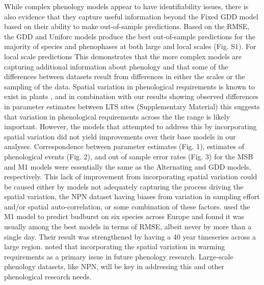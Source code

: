 \documentclass[fleqn,10pt,lineno]{wlpeerj} %
\begin{document}
While complex phenology models appear to have identifiability issues, there is also evidence that they capture useful information beyond the Fixed GDD model based on their ability to make out-of-sample predictions. Based on the RMSE, the GDD and Uniforc models produce the best out-of-sample predictions for the majority of species and phenophases at both large and local scales (Fig. S1). For local scale predictions This demonstrates that the more complex models are capturing additional information about phenology and that some of the differences between datasets result from differences in either the scales or the sampling of the data. Spatial variation in phenological requirements is known to exist in plants \citep{zhang2017}, and in combination with our results showing observed differences in parameter estimates between LTS sites (Supplementary Material) this suggests that variation in phenological requirements across the the range is likely important. However, the models that attempted to address this by incorporating spatial variation did not yield improvements over their base models in our analyses. Correspondence between parameter estimates (Fig. 1), estimates of phenological events (Fig. 2), and out of sample error rates (Fig. 3) for the MSB and M1 models were essentially the same as the Alternating and GDD models, respectively. This lack of improvement from incorporating spatial variation could be caused either by models not adequately capturing the process driving the spatial variation, the NPN dataset having biases from variation in sampling effort and/or spatial auto-correlation, or some combination of these factors. \cite{basler2016} used the M1 model to predict budburst on six species across Europe and found it was usually among the best models in terms of RMSE, albeit never by more than a single day. Their result was strengthened by having a 40 year timeseries across a large region. \cite{chuine2017} noted that incorporating the spatial variation in warming requirements as a primary issue in future phenology research. Large-scale phenology datasets, like NPN, will be key in addressing this and other phenological research needs.
\end{document}
